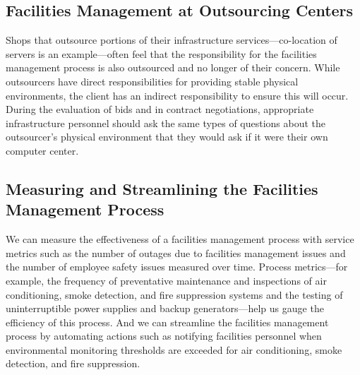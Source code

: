 \documentclass[a4]{article}
\begin{document}
\begin{multicols}{3}
\subsection{Facilities Management at Outsourcing Centers}
Shops that outsource portions of their infrastructure services—co-location of servers is an example—often feel that the 
responsibility for the facilities management process is also outsourced and no longer of their concern. 
While outsourcers have direct responsibilities for providing stable physical environments, the client has an 
indirect responsibility to ensure this will occur. 
During the evaluation of bids and in contract negotiations, appropriate infrastructure personnel should ask the same 
types of questions about the outsourcer’s physical environment that they would ask if it were their own computer center.
\subsection{Measuring and Streamlining the Facilities Management Process}
We can measure the effectiveness of a facilities management process with service metrics such as the number 
of outages due to facilities management issues and the number of employee safety issues measured over time. 
Process metrics—for example, the frequency of preventative maintenance and inspections of air conditioning, 
smoke detection, and fire suppression systems and the testing of uninterruptible power supplies and backup 
generators—help us gauge the efficiency of this process. And we can streamline the facilities management process by 
automating actions such as notifying facilities personnel when environmental monitoring thresholds are exceeded 
for air conditioning, smoke detection, and fire suppression.


\end{multicols}
\end{document}
